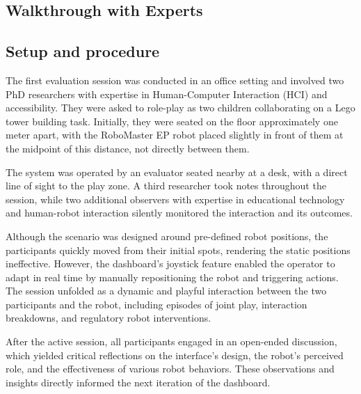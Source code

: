 \documentclass[a4paper]{usiinfbachelorproject}
\begin{document}
\subsection{\textbf{Walkthrough with Experts}}\label{sec:expert-walkthrough}
\subsection*{\textbf{Setup and procedure}}
The first evaluation session was conducted in an office setting and involved two PhD researchers with expertise in Human-Computer Interaction (HCI) and accessibility.
They were asked to role-play as two children collaborating on a Lego tower building task.
Initially, they were seated on the floor approximately one meter apart, with the RoboMaster EP robot placed slightly in front of them at the midpoint of this distance, not directly between them.

The system was operated by an evaluator seated nearby at a desk, with a direct line of sight to the play zone.
A third researcher took notes throughout the session, while two additional observers with expertise in educational technology and human-robot interaction silently monitored the interaction and its outcomes.

Although the scenario was designed around pre-defined robot positions, the participants quickly moved from their initial spots, rendering the static positions ineffective.
However, the dashboard's joystick feature enabled the operator to adapt in real time by manually repositioning the robot and triggering actions.
The session unfolded as a dynamic and playful interaction between the two participants and the robot, including episodes of joint play, interaction breakdowns, and regulatory robot interventions.

After the active session, all participants engaged in an open-ended discussion, which yielded critical reflections on the interface's design, the robot's perceived role, and the effectiveness of various robot behaviors.
These observations and insights directly informed the next iteration of the dashboard.
\end{document}
